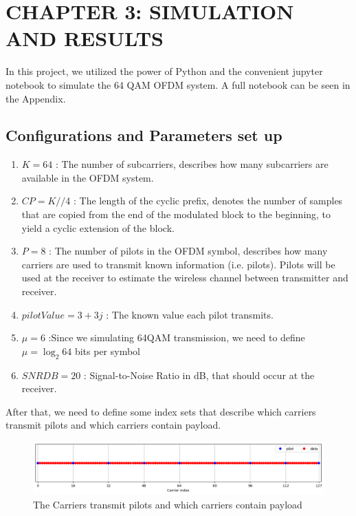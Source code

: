 \section*{CHAPTER 3: SIMULATION AND RESULTS}
\setcounter{section}{4}
\setcounter{subsection}{0}
\setcounter{figure}{0}
\setcounter{table}{0}

In this project, we utilized the power of Python and the convenient jupyter notebook to simulate the 64 QAM OFDM system. A full notebook can be seen in the Appendix.

\subsection{Configurations and Parameters set up}

\begin{enumerate}
    \item $K = 64$ : The number of subcarriers, describes how many subcarriers are available in the OFDM system.
    \item $CP = K//$4 : The length of the cyclic prefix, denotes the number of samples that are copied from the end of the modulated block to the beginning, to yield a cyclic extension of the block.
    \item $P = 8$ : The number of pilots in the OFDM symbol, describes how many carriers are used to transmit known information (i.e. pilots). Pilots will be used at the receiver to estimate the wireless channel between transmitter and receiver.
    \item $pilotValue = 3+3j$ : The known value each pilot transmits.
    \item $\mu = 6$ :Since we simulating 64QAM transmission, we need to define $\mu = \log_{2} 64$ bits per symbol
    \item $SNRDB = 20$ : Signal-to-Noise Ratio in dB, that should occur at the receiver.
\end{enumerate}

After that, we need to define some index sets that describe which carriers transmit pilots and which carriers contain payload.

\begin{figure}[htbp]
    \centering
    \includegraphics[width=\linewidth]{../Source/results/carrier_index}
    \caption{The Carriers transmit pilots and which carriers contain payload}
    \label{carrier_index}
\end{figure}

